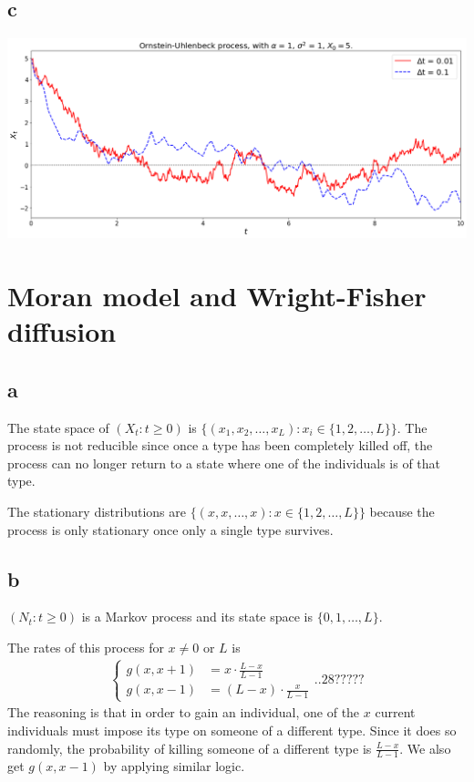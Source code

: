 \documentclass[12pt, twoside, a4paper]{article}
\begin{document}
\subsection*{c}
\includegraphics[width = 170mm]{O-U}

\section{Moran model and Wright-Fisher diffusion}
\subsection*{a}
The state space of $(X_t : t \geq 0)$ is $\{ (x_1, x_2, \dots, x_L) : x_i \in \{ 1, 2, \dots, L\}\}$. The process is not reducible since once a type has been completely killed off, the process can no longer return to a state where one of the individuals is of that type.

The stationary distributions are $\{(x, x, \dots, x) : x \in \{1, 2, \dots, L\}\}$ because the process is only stationary once only a single type survives. 

\subsection*{b}
$(N_t : t \geq 0)$ is a Markov process and its state space is $\{0, 1, \dots, L\}$. 

The rates of this process for $x \neq 0 \text{ or } L$ is 
\begin{align*}
\begin{cases}
g(x, x+1) &= x \cdot \frac{L-x}{L-1}\\
g(x, x-1) &= (L-x) \cdot \frac{x}{L-1}
\end{cases}
..28?????\end{align*}
The reasoning is that in order to gain an individual, one of the $x$ current individuals must impose its type on someone of a different type. Since it does so randomly, the probability of killing someone of a different type is $\frac{L-x}{L-1}$. We also get $g(x, x-1)$ by applying similar logic. 
\end{document}
